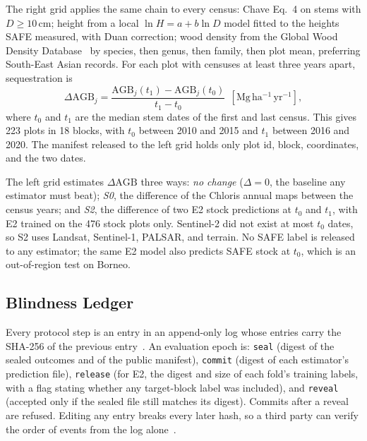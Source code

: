 \documentclass[conference,a4paper]{IEEEtran}
\begin{document}
The right grid applies the same chain to every census: Chave Eq.~4 on stems with $D\geq10$\,cm; height from a local $\ln H=a+b\ln D$ model fitted to the heights SAFE measured, with Duan correction; wood density from the Global Wood Density Database~\cite{zanne2009gwdd,chave2009wood} by species, then genus, then family, then plot mean, preferring South-East Asian records. For each plot with censuses at least three years apart, sequestration is
\begin{equation}
\Delta\mathrm{AGB}_j=\frac{\mathrm{AGB}_j(t_1)-\mathrm{AGB}_j(t_0)}{t_1-t_0}\ \ [\mathrm{Mg\,ha^{-1}\,yr^{-1}}],
\end{equation}
where $t_0$ and $t_1$ are the median stem dates of the first and last census. This gives 223 plots in 18 blocks, with $t_0$ between 2010 and 2015 and $t_1$ between 2016 and 2020. The manifest released to the left grid holds only plot id, block, coordinates, and the two dates.

The left grid estimates $\Delta\mathrm{AGB}$ three ways: \emph{no change} ($\Delta=0$, the baseline any estimator must beat); \emph{S0}, the difference of the Chloris annual maps between the census years; and \emph{S2}, the difference of two E2 stock predictions at $t_0$ and $t_1$, with E2 trained on the 476 stock plots only. Sentinel-2 did not exist at most $t_0$ dates, so S2 uses Landsat, Sentinel-1, PALSAR, and terrain. No SAFE label is released to any estimator; the same E2 model also predicts SAFE stock at $t_0$, which is an out-of-region test on Borneo.

\subsection{Blindness Ledger}
Every protocol step is an entry in an append-only log whose entries carry the SHA-256 of the previous entry~\cite{haber1991timestamp}. An evaluation epoch is: \texttt{seal} (digest of the sealed outcomes and of the public manifest), \texttt{commit} (digest of each estimator's prediction file), \texttt{release} (for E2, the digest and size of each fold's training labels, with a flag stating whether any target-block label was included), and \texttt{reveal} (accepted only if the sealed file still matches its digest). Commits after a reveal are refused. Editing any entry breaks every later hash, so a third party can verify the order of events from the log alone~\cite{blum1983coin}.
\end{document}
